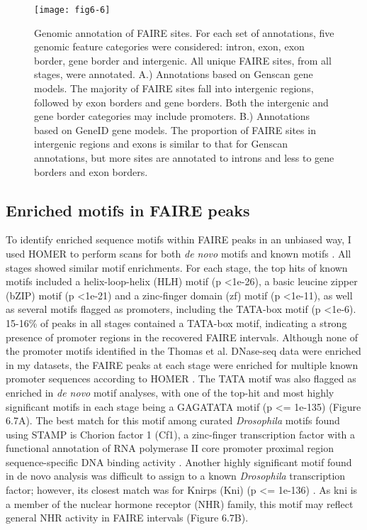 \begin{figure}
\centering
\texttt{[image: fig6-6]}
\caption{Genomic annotation of FAIRE sites. For each set of annotations, five genomic feature categories were considered: intron, exon, exon border, gene border and intergenic. All unique FAIRE sites, from all stages, were annotated. A.) Annotations based on Genscan gene models. The majority of FAIRE sites fall into intergenic regions, followed by exon borders and gene borders. Both the intergenic and gene border categories may include promoters. B.) Annotations based on GeneID gene models. The proportion of FAIRE sites in intergenic regions and exons is similar to that for Genscan annotations, but more sites are annotated to introns and less to gene borders and exon borders.}
\label{Figure 6.6}
\end{figure}

\subsection{Enriched motifs in FAIRE peaks}
To identify enriched sequence motifs within FAIRE peaks in an unbiased way, I used HOMER to perform scans for both \emph{de novo} motifs and known motifs \citep{heinz_simple_2010}. All stages showed similar motif enrichments. For each stage, the top hits of known motifs included a helix-loop-helix (HLH) motif (p \textless 1e-26), a basic leucine zipper (bZIP) motif (p \textless 1e-21) and a zinc-finger domain (zf) motif (p \textless 1e-11), as well as several motifs flagged as promoters, including the TATA-box motif (p \textless 1e-6). 15-16\% of peaks in all stages contained a TATA-box motif, indicating a strong presence of promoter regions in the recovered FAIRE intervals. Although none of the promoter motifs identified in the Thomas et al. DNase-seq data were enriched in my datasets, the FAIRE peaks at each stage were enriched for multiple known promoter sequences according to HOMER \citep{thomas_dynamic_2011}. The TATA motif was also flagged as enriched in \emph{de novo} motif analyses, with one of the top-hit and most highly significant motifs in each stage being a GAGATATA motif (p \textless= 1e-135) (Figure 6.7A). The best match for this motif among curated \emph{Drosophila} motifs found using STAMP is Chorion factor 1 (Cf1), a zinc-finger transcription factor with a functional annotation of RNA polymerase II core promoter proximal region sequence-specific DNA binding activity \citep{mahony_stamp:_2007}. Another highly significant motif found in de novo analysis was difficult to assign to a known \emph{Drosophila} transcription factor; however, its closest match was for Knirps (Kni) (p \textless= 1e-136) . As kni is a member of the nuclear hormone receptor (NHR) family, this motif may reflect general NHR activity in FAIRE intervals (Figure 6.7B).\\

